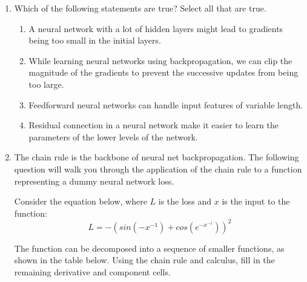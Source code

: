 \documentclass[12pt, letterpaper]{article}
\begin{document}
    \begin{enumerate}[label=\alph*.]
        \item Which of the following statements are true? Select all that are true.
        \begin{enumerate}
            \item A neural network with a lot of hidden layers might lead to gradients being too small in the initial layers.
            \item While learning neural networks using backpropagation,  we can clip the magnitude of the gradients to prevent the successive updates from being too large.
            \item Feedforward neural networks can handle input features of variable length.
            \item Residual connection in a neural network make it easier to learn the parameters of the lower levels of the network.
        \end{enumerate}
        
         \item The chain rule is the backbone of neural net backpropagation. The following question will walk you through the application of the chain rule to a function representing a dummy neural network loss.
         
         Consider the equation below, where $L$ is the loss and $x$ is the input to the function:
         $$L = -(sin(-x^{-1}) + cos(e^{-x^{-1}}))^2$$
         
         The function can be decomposed into a sequence of smaller functions, as shown in the table below. Using the chain rule and calculus, fill in the remaining derivative and component cells. 
        

\end{enumerate}
\end{document}
